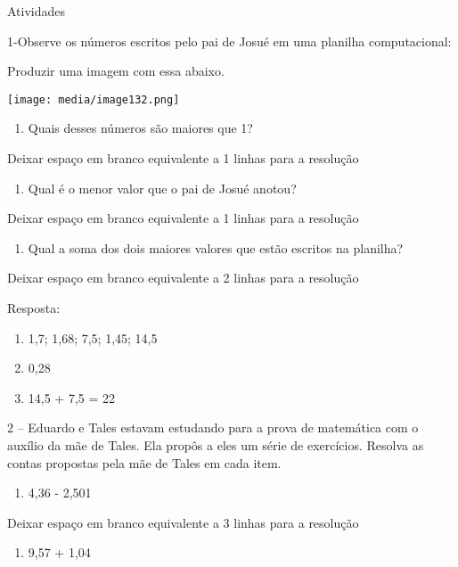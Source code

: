 Atividades

1-Observe os números escritos pelo pai de Josué em uma planilha
computacional:

Produzir uma imagem com essa abaixo.

\texttt{[image: media/image132.png]}

\begin{enumerate}
\def\labelenumi{\alph{enumi})}
\item
  Quais desses números são maiores que 1?
\end{enumerate}

Deixar espaço em branco equivalente a 1 linhas para a resolução

\begin{enumerate}
\def\labelenumi{\alph{enumi})}
\item
  Qual é o menor valor que o pai de Josué anotou?
\end{enumerate}

Deixar espaço em branco equivalente a 1 linhas para a resolução

\begin{enumerate}
\def\labelenumi{\alph{enumi})}
\item
  Qual a soma dos dois maiores valores que estão escritos na planilha?
\end{enumerate}

Deixar espaço em branco equivalente a 2 linhas para a resolução

Resposta:

\begin{enumerate}
\def\labelenumi{\alph{enumi})}
\item
  1,7; 1,68; 7,5; 1,45; 14,5
\item
  0,28
\item
  14,5 + 7,5 = 22
\end{enumerate}

2 -- Eduardo e Tales estavam estudando para a prova de matemática com o
auxílio da mãe de Tales. Ela propôs a eles um série de exercícios.
Resolva as contas propostas pela mãe de Tales em cada item.

\begin{enumerate}
\def\labelenumi{\alph{enumi})}
\item
  4,36 - 2,501
\end{enumerate}

Deixar espaço em branco equivalente a 3 linhas para a resolução

\begin{enumerate}
\def\labelenumi{\alph{enumi})}
\item
  9,57 + 1,04
\end{enumerate}

